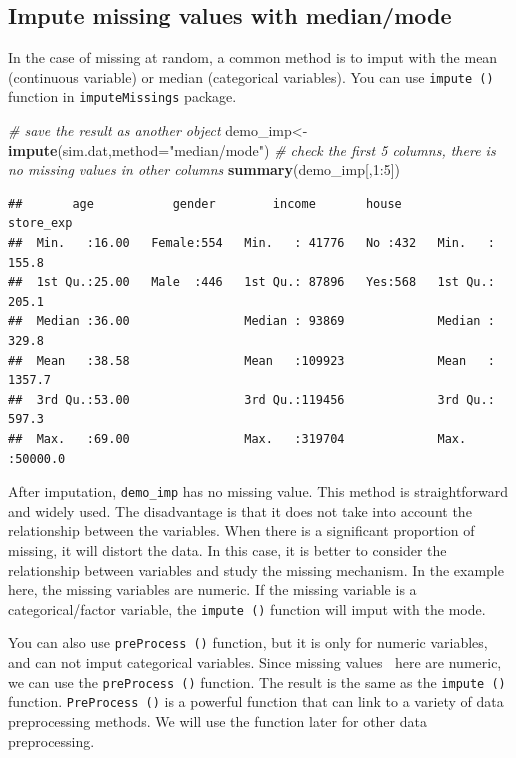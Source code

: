 \documentclass[]{book}
\newenvironment{Shaded}{\begin{snugshade}}{\end{snugshade}}
\newcommand{\KeywordTok}[1]{\textcolor[rgb]{0.13,0.29,0.53}{\textbf{{#1}}}}
\newcommand{\DataTypeTok}[1]{\textcolor[rgb]{0.13,0.29,0.53}{{#1}}}
\newcommand{\DecValTok}[1]{\textcolor[rgb]{0.00,0.00,0.81}{{#1}}}
\newcommand{\StringTok}[1]{\textcolor[rgb]{0.31,0.60,0.02}{{#1}}}
\newcommand{\CommentTok}[1]{\textcolor[rgb]{0.56,0.35,0.01}{\textit{{#1}}}}
\newcommand{\NormalTok}[1]{{#1}}
\theoremstyle{definition}
\theoremstyle{definition}
\theoremstyle{remark}
\begin{document}
\subsection{Impute missing values with
median/mode}\label{impute-missing-values-with-medianmode}

In the case of missing at random, a common method is to imput with the
mean (continuous variable) or median (categorical variables). You can
use \texttt{impute\ ()} function in \texttt{imputeMissings} package.

\begin{Shaded}
\begin{Highlighting}[]
\CommentTok{# save the result as another object}
\NormalTok{demo_imp<-}\KeywordTok{impute}\NormalTok{(sim.dat,}\DataTypeTok{method=}\StringTok{"median/mode"}\NormalTok{)}
\CommentTok{# check the first 5 columns, there is no missing values in other columns}
\KeywordTok{summary}\NormalTok{(demo_imp[,}\DecValTok{1}\NormalTok{:}\DecValTok{5}\NormalTok{])}
\end{Highlighting}
\end{Shaded}

\begin{verbatim}
##       age           gender        income       house       store_exp      
##  Min.   :16.00   Female:554   Min.   : 41776   No :432   Min.   :  155.8  
##  1st Qu.:25.00   Male  :446   1st Qu.: 87896   Yes:568   1st Qu.:  205.1  
##  Median :36.00                Median : 93869             Median :  329.8  
##  Mean   :38.58                Mean   :109923             Mean   : 1357.7  
##  3rd Qu.:53.00                3rd Qu.:119456             3rd Qu.:  597.3  
##  Max.   :69.00                Max.   :319704             Max.   :50000.0
\end{verbatim}

After imputation, \texttt{demo\_imp} has no missing value. This method
is straightforward and widely used. The disadvantage is that it does not
take into account the relationship between the variables. When there is
a significant proportion of missing, it will distort the data. In this
case, it is better to consider the relationship between variables and
study the missing mechanism. In the example here, the missing variables
are numeric. If the missing variable is a categorical/factor variable,
the \texttt{impute\ ()} function will imput with the mode.

You can also use \texttt{preProcess\ ()} function, but it is only for
numeric variables, and can not imput categorical variables. Since
missing values here are numeric, we can use the
\texttt{preProcess\ ()} function. The result is the same as the
\texttt{impute\ ()} function. \texttt{PreProcess\ ()} is a powerful
function that can link to a variety of data preprocessing methods. We
will use the function later for other data preprocessing.
\end{document}
